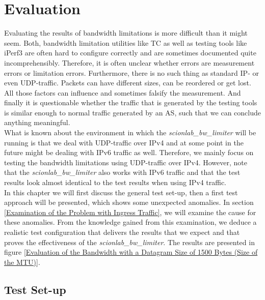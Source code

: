 \chapter{Evaluation}

Evaluating the results of bandwidth limitations is more difficult than it might seem. Both, bandwidth limitation utilities like \acs{TC} as well as testing tools like iPerf3 are often hard to configure correctly and are sometimes documented quite incomprehensibly. Therefore, it is often unclear whether errors are measurement errors or limitation errors. Furthermore, there is no such thing as standard \acs{IP}- or even \ac{UDP}-traffic. Packets can have different sizes, can be reordered or get lost. All those factors can influence and sometimes falsify the measurement. And finally it is questionable whether the traffic that is generated by the testing tools is similar enough to normal traffic generated by an \acs{AS}, such that we can conclude anything meaningful.
\\
What is known about the environment in which the \textit{scionlab\_bw\_limiter} will be running is that we deal with \acs{UDP}-traffic over \acs{IP}v4 and at some point in the future might be dealing with \acs{IP}v6 traffic as well. Therefore, we mainly focus on testing the bandwidth limitations using \acs{UDP}-traffic over \acs{IP}v4. However, note that the \textit{scionlab\_bw\_limiter} also works with \acs{IP}v6 traffic and that the test results look almost identical to the test results when using \acs{IP}v4 traffic.
\\
In this chapter we will first discuss the general test set-up, then a first test approach will be presented, which shows some unexpected anomalies. In section \ref{Examination of the Problem with Ingress Traffic}, we will examine the cause for these anomalies. From the  knowledge gained from this examination, we deduce a realistic test configuration that delivers the results that we expect and that proves the effectiveness of the \textit{scionlab\_bw\_limiter}. The results are presented in figure \ref{Evaluation of the Bandwidth with a Datagram Size of 1500 Bytes (Size of the MTU)}.

\newpage

\section{Test Set-up}

